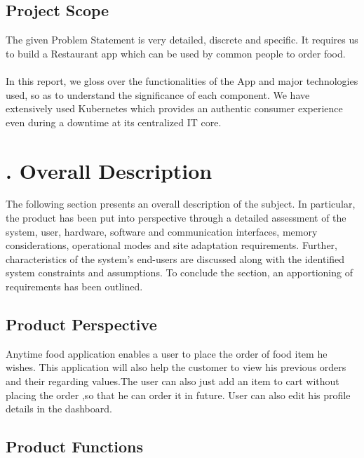 \documentclass{scrreprt}
\begin{document}
\section{Project Scope}
The given Problem Statement is very detailed, discrete and specific. It requires us to build a Restaurant app which can be used by common people to order food. \\ \\
In this report, we gloss over the functionalities of the App and major technologies used, so as to understand the significance of each component. We have extensively used Kubernetes which provides an authentic consumer experience even during a downtime at its centralized IT core. \\

\chapter{. Overall Description}
The following section presents an overall description of the subject. In particular, the product
has been put into perspective through a detailed assessment of the system, user, hardware, software
and communication interfaces, memory considerations, operational modes and site adaptation
requirements. Further, characteristics of the system’s end-users are discussed along with the
identified system constraints and assumptions. To conclude the section, an apportioning of
requirements has been outlined.

\section{Product Perspective}
Anytime food application enables a user to place the order of food item he wishes. This application will also help the customer to view his previous orders and their regarding values.The user can also just add an item to cart without placing the order ,so that he can order it in future.
User can also edit his profile details in the dashboard.




\section{Product Functions}
\end{document}
